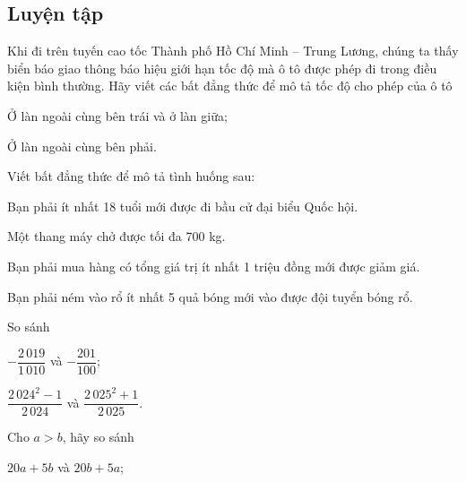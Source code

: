 \begin{practice}
    \subsection{Luyện tập}

    \begin{questions}[resume=SBT]
        \item Khi đi trên tuyến cao tốc Thành phố Hồ Chí Minh -- Trung Lương, chúng ta thấy biển báo giao thông báo hiệu giới hạn tốc độ mà ô tô được phép đi trong điều kiện bình thường. Hãy viết các bất đẳng thức để mô tả tốc độ cho phép của ô tô
        \begin{questions}
            \item Ở làn ngoài cùng bên trái và ở làn giữa;
            \item Ở làn ngoài cùng bên phải.
        \end{questions}
        \answerline

        \item Viết bất đẳng thức để mô tả tình huống sau:
        \begin{questions}
            \item Bạn phải ít nhất 18 tuổi mới được đi bầu cử đại biểu Quốc hội.
            \item Một thang máy chở được tối đa 700 kg.
            \item Bạn phải mua hàng có tổng giá trị ít nhất 1 triệu đồng mới được giảm giá.
            \item Bạn phải ném vào rổ ít nhất 5 quả bóng mới vào được đội tuyển bóng rổ.
        \end{questions}
        \answerline

        \item So sánh
        \begin{questions}
            \item $-\dfrac{2\,019}{1\,010}$ và $-\dfrac{201}{100}$;

            \answerline
            \item $\dfrac{2\,024^2-1}{2\,024}$ và $\dfrac{2\,025^2+1}{2\,025}$.

            \answerline
        \end{questions}

        \item Cho $a>b$, hãy so sánh
        \begin{questions}
            \item $20a+5b$ và $20b+5a$;


\end{questions}
\end{questions}
\end{practice}
